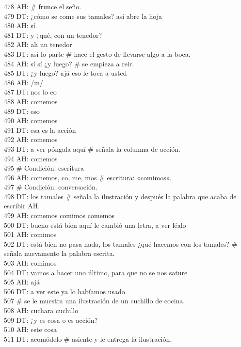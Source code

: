 478 AH: \# frunce el seño.\\
479 DT: ¿cómo se come sus tamales? así abre la hoja\\
480 AH: sí\\
481 DT: y ¿qué, con un tenedor?\\
482 AH: ah un tenedor\\
483 DT: así lo parte \# hace el gesto de llevarse algo a la boca.\\
484 AH: sí sí ¿y luego? \# se empieza a reir.\\
485 DT: ¿y luego? ajá eso le toca a usted\\
486 AH: /m/\\
487 DT: nos lo co\\
488 AH: comemos\\
489 DT: eso\\
490 AH: comemos\\
491 DT: esa es la acción\\
492 AH: comemos\\
493 DT: a ver póngala aquí \# señala la columna de acción.\\
494 AH: comemos\\
495 \# Condición: escritura\\
496 AH: comemos, co, me, mos \# escritura: «comimos».\\
497 \# Condición: conversación.\\
498 DT: los tamales \# señala la ilustración y después la palabra que acaba de escribir AH.\\
499 AH: comemos comimos comemos\\
500 DT: bueno está bien aquí le cambió una letra, a ver léalo\\
501 AH: comimos\\
502 DT: está bien no pasa nada, los tamales ¿qué hacemos con los tamales? \# señala nuevamente la palabra escrita.\\
503 AH: comimos\\
504 DT: vamos a hacer uno último, para que no se nos sature\\
505 AH: ajá\\
506 DT: a ver este ya lo habíamos usado\\
507 \# se le muestra una ilustración de un cuchillo de cocina.\\
508 AH: cuchara cuchillo\\
509 DT: ¿y es cosa o es acción?\\
510 AH: este cosa\\
511 DT: acomódelo \# asiente y le entrega la ilustración.\\
